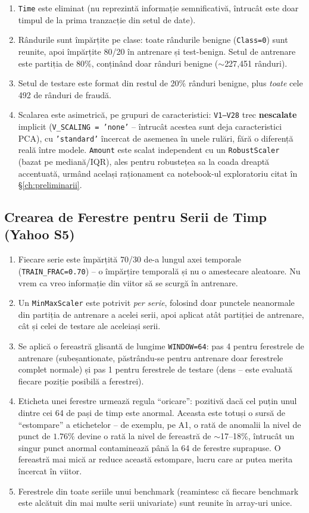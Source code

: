 \begin{enumerate}
  \item \texttt{Time} este eliminat (nu reprezintă informație semnificativă, întrucât este doar timpul de la prima tranzacție din setul de date).
  \item Rândurile sunt împărțite pe clase: toate rândurile benigne (\texttt{Class=0}) sunt reunite, apoi împărțite 80/20 în antrenare și test-benign. Setul de antrenare este partiția de 80\%, conținând doar rânduri benigne ($\sim$227{,}451 rânduri).
  \item Setul de testare este format din restul de 20\% rânduri benigne, plus \emph{toate} cele 492 de rânduri de fraudă.
  \item Scalarea este asimetrică, pe grupuri de caracteristici: \texttt{V1--V28} trec \textbf{nescalate} implicit (\texttt{V\_SCALING = 'none'} -- întrucât acestea sunt deja caracteristici PCA), cu \texttt{'standard'} încercat de asemenea în unele rulări, fără o diferență reală între modele. \texttt{Amount} este scalat independent cu un \texttt{RobustScaler} (bazat pe mediană/IQR), ales pentru robustețea sa la coada dreaptă accentuată, urmând același raționament ca notebook-ul exploratoriu citat în \S\ref{ch:preliminarii}.
\end{enumerate}

\subsection{Crearea de Ferestre pentru Serii de Timp (Yahoo S5)}

\begin{enumerate}
  \item Fiecare serie este împărțită 70/30 de-a lungul axei temporale (\texttt{TRAIN\_FRAC=0.70}) -- o împărțire temporală și nu o amestecare aleatoare. Nu vrem ca vreo informație din viitor să se scurgă în antrenare.
  \item Un \texttt{MinMaxScaler} este potrivit \emph{per serie}, folosind doar punctele neanormale din partiția de antrenare a acelei serii, apoi aplicat atât partiției de antrenare, cât și celei de testare ale aceleiași serii.
  \item Se aplică o fereastră glisantă de lungime \texttt{WINDOW=64}: pas 4 pentru ferestrele de antrenare (subeșantionate, păstrându-se pentru antrenare doar ferestrele complet normale) și pas 1 pentru ferestrele de testare (dens -- este evaluată fiecare poziție posibilă a ferestrei).
  \item Eticheta unei ferestre urmează regula \enquote{oricare}: pozitivă dacă cel puțin unul dintre cei 64 de pași de timp este anormal. Aceasta este totuși o sursă de \enquote{estompare} a etichetelor -- de exemplu, pe A1, o rată de anomalii la nivel de punct de $1.76\%$ devine o rată la nivel de fereastră de $\sim$17--18\%, întrucât un singur punct anormal contaminează până la 64 de ferestre suprapuse. O fereastră mai mică ar reduce această estompare, lucru care ar putea merita încercat în viitor.
  \item Ferestrele din toate seriile unui benchmark (reamintesc că fiecare benchmark este alcătuit din mai multe serii univariate) sunt reunite în array-uri unice.
\end{enumerate}

